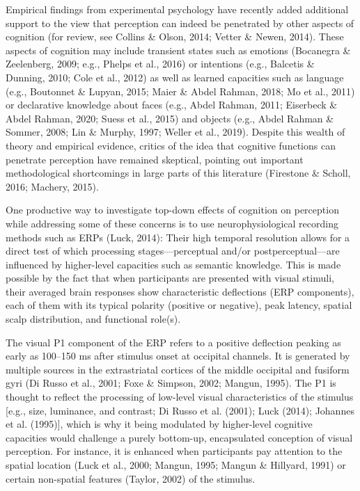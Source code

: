 \documentclass[
  english,
  doc,12pt,twoside,floatsintext]{apa7}
\begin{document}
Empirical findings from experimental psychology have recently added additional support to the view that perception can indeed be penetrated by other aspects of cognition (for review, see Collins \& Olson, 2014; Vetter \& Newen, 2014). These aspects of cognition may include transient states such as emotions (Bocanegra \& Zeelenberg, 2009; e.g., Phelps et al., 2016) or intentions (e.g., Balcetis \& Dunning, 2010; Cole et al., 2012) as well as learned capacities such as language (e.g., Boutonnet \& Lupyan, 2015; Maier \& Abdel Rahman, 2018; Mo et al., 2011) or declarative knowledge about faces (e.g., Abdel Rahman, 2011; Eiserbeck \& Abdel Rahman, 2020; Suess et al., 2015) and objects (e.g., Abdel Rahman \& Sommer, 2008; Lin \& Murphy, 1997; Weller et al., 2019). Despite this wealth of theory and empirical evidence, critics of the idea that cognitive functions can penetrate perception have remained skeptical, pointing out important methodological shortcomings in large parts of this literature (Firestone \& Scholl, 2016; Machery, 2015).

One productive way to investigate top-down effects of cognition on perception while addressing some of these concerns is to use neurophysiological recording methods such as ERPs (Luck, 2014): Their high temporal resolution allows for a direct test of which processing stages---perceptual and/or postperceptual---are influenced by higher-level capacities such as semantic knowledge. This is made possible by the fact that when participants are presented with visual stimuli, their averaged brain responses show characteristic deflections (ERP components), each of them with its typical polarity (positive or negative), peak latency, spatial scalp distribution, and functional role(s).

The visual P1 component of the ERP refers to a positive deflection peaking as early as 100--150 ms after stimulus onset at occipital channels. It is generated by multiple sources in the extrastriatal cortices of the middle occipital and fusiform gyri (Di Russo et al., 2001; Foxe \& Simpson, 2002; Mangun, 1995). The P1 is thought to reflect the processing of low-level visual characteristics of the stimulus {[}e.g., size, luminance, and contrast; Di Russo et al. (2001); Luck (2014); Johannes et al. (1995){]}, which is why it being modulated by higher-level cognitive capacities would challenge a purely bottom-up, encapsulated conception of visual perception. For instance, it is enhanced when participants pay attention to the spatial location (Luck et al., 2000; Mangun, 1995; Mangun \& Hillyard, 1991) or certain non-spatial features (Taylor, 2002) of the stimulus.
\end{document}
